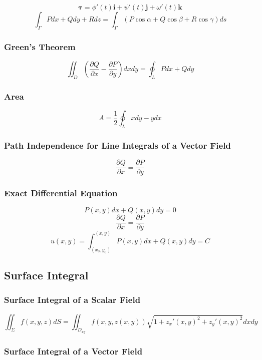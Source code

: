 \documentclass{article}
\begin{document}
\[
    \boldsymbol{\tau} = \phi'(t) \mathbf{i} + \psi'(t) \mathbf{j} + \omega'(t) \mathbf{k}
\]
\[
    \int_\Gamma P dx + Q dy + R dz = \int_\Gamma (P \cos \alpha + Q \cos \beta + R \cos \gamma) ds
\]

\subsubsection{Green's Theorem}

\[
    \iint_D \left(\frac{\partial Q}{\partial x} - \frac{\partial P}{\partial y}\right) dx dy = \oint_L P dx + Q dy
\]

\subsubsection{Area}

\[
    A = \frac{1}{2} \oint_L x dy - y dx
\]

\subsubsection{Path Independence for Line Integrals of a Vector Field}

\[
    \frac{\partial Q}{\partial x} = \frac{\partial P}{\partial y}
\]

\subsubsection{Exact Differential Equation}

\[
    P(x, y) dx + Q(x, y) dy = 0
\]
\[
    \frac{\partial Q}{\partial x} = \frac{\partial P}{\partial y}
\]
\[
    u(x, y) = \int_{(x_0, y_0)}^{(x, y)} P(x, y) dx + Q(x, y) dy = C
\]

\subsection{Surface Integral}

\subsubsection{Surface Integral of a Scalar Field}

\[
    \iint_\Sigma f(x, y, z) dS = \iint_{D_{xy}} f(x, y, z(x, y)) \sqrt{1 + z_x'(x, y)^2 + z_y'(x, y)^2} dx dy
\]

\subsubsection{Surface Integral of a Vector Field}
\end{document}
